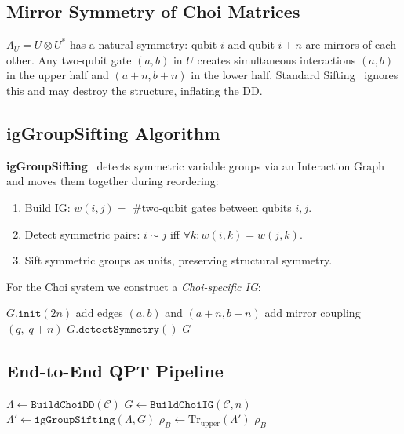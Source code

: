 \documentclass[11pt,a4paper]{article}
\begin{document}
\subsection{Mirror Symmetry of Choi Matrices}

$\Lambda_U = U \otimes U^*$ has a natural symmetry: qubit $i$ and qubit $i+n$
are mirrors of each other. Any two-qubit gate $(a,b)$ in $U$ creates
simultaneous interactions $(a,b)$ in the upper half and $(a{+}n, b{+}n)$ in
the lower half. Standard Sifting~\cite{rudell1993sifting} ignores this and
may destroy the structure, inflating the DD.

\subsection{igGroupSifting Algorithm}

\textbf{igGroupSifting}~\cite{iggroup2024} detects symmetric variable groups
via an Interaction Graph and moves them together during reordering:

\begin{enumerate}
  \item Build IG: $w(i,j) = $ \#two-qubit gates between qubits $i,j$.
  \item Detect symmetric pairs: $i \sim j$ iff $\forall k: w(i,k)=w(j,k)$.
  \item Sift symmetric groups as units, preserving structural symmetry.
\end{enumerate}

For the Choi system we construct a \emph{Choi-specific IG}:

\begin{algorithm}[h]
\caption{Build Choi IG}
\begin{algorithmic}[1]
  \State $G.\texttt{init}(2n)$
  \For{each gate $g$ involving qubits $\{a,b,\ldots\} \subseteq [0,n)$}
    \State add edges $(a,b)$ and $(a{+}n, b{+}n)$
  \EndFor
    \State add mirror coupling $(q,\; q{+}n)$ 
  \EndFor
  \State $G.\texttt{detectSymmetry}()$
  \State \Return $G$
\EndProcedure
\end{algorithmic}
\end{algorithm}

\subsection{End-to-End QPT Pipeline}

\begin{algorithm}[h]
\caption{QPT Pipeline with igGroupSifting}
\begin{algorithmic}[1]
  \State $\Lambda \gets \texttt{BuildChoiDD}(\mathcal{C})$
  \State $G \gets \texttt{BuildChoiIG}(\mathcal{C}, n)$
  \State $\Lambda' \gets \texttt{igGroupSifting}(\Lambda, G)$
  \State $\rho_B \gets \mathrm{Tr}_{\mathrm{upper}}(\Lambda')$
  \State \Return $\rho_B$
\EndProcedure
\end{algorithmic}
\end{algorithm}
\end{document}
